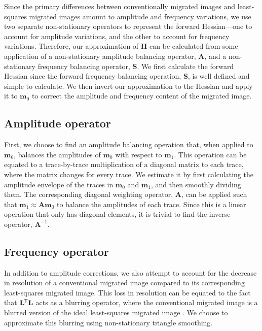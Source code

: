    Since the primary differences between conventionally migrated images and least-squares migrated images amount to amplitude and frequency variations, we use two separate non-stationary operators to represent the forward Hessian---one to account for amplitude variations, and the other to account for frequency variations. 
    Therefore, our approximation of $\mathbf{H}$ can be calculated from some application of a non-stationary amplitude balancing operator, $\mathbf{A}$, and a non-stationary frequency balancing operator, $\mathbf{S}$.
    We first calculate the forward Hessian since the forward frequency balancing operation, $\mathbf{S}$, is well defined and simple to calculate. 
    We then invert our approximation to the Hessian and apply it to $\mathbf{m}_0$ to correct the amplitude and frequency content of the migrated image.

\subsection{Amplitude operator}
    First, we choose to find an amplitude balancing operation that, when applied to $\mathbf{m}_0$, balances the amplitudes of $\mathbf{m}_0$ with respect to $\mathbf{m}_1$. 
    This operation can be equated to a trace-by-trace multiplication of a diagonal matrix to each trace, where the matrix changes for every trace.
    We estimate it by first calculating the amplitude envelope of the traces in $\mathbf{m}_0$ and $\mathbf{m}_1$, and then smoothly dividing them.
    The corresponding diagonal weighting operator, $\mathbf{A}$, can be applied such that $\mathbf{m}_1 \approx \mathbf{A}\mathbf{m}_0$ to balance the amplitudes of each trace.
    Since this is a linear operation that only has diagonal elements, it is trivial to find the inverse operator, $\mathbf{A}^{-1}$. 

\subsection{Frequency operator}
    In addition to amplitude corrections, we also attempt to account for the decrease in resolution of a conventional migrated image compared to its corresponding least-squares migrated image. 
    This loss in resolution can be equated to the fact that $\mathbf{L}^{\mkern-1.5mu\mathsf{T}}\mathbf{L}$ acts as a blurring operator, where the conventional migrated image is a blurred version of the ideal least-squares migrated image \cite[]{poststack}. 
    We choose to approximate this blurring using non-stationary triangle smoothing.

